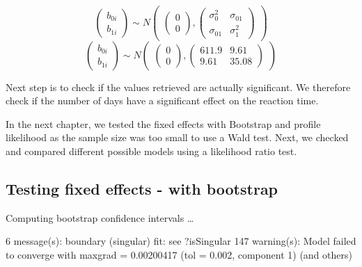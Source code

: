 \documentclass[
]{article}
\begin{document}
\[
\begin{pmatrix} b_{0i} \\ b_{1i} \end{pmatrix}
\sim N
\begin{pmatrix}
\begin{pmatrix} 0 \\ 0 \end{pmatrix},
\begin{pmatrix}
\sigma_{0}^2 & \sigma_{01} \\
\sigma_{01} & \sigma_{1}^2 
\end{pmatrix}
\end{pmatrix}
\] \[
\begin{pmatrix} b_{0i} \\ b_{1i} \end{pmatrix}
\sim N
\begin{pmatrix}
\begin{pmatrix} 0 \\ 0 \end{pmatrix},
\begin{pmatrix}
611.9 & 9.61 \\
9.61 & 35.08 
\end{pmatrix}
\end{pmatrix}
\]

Next step is to check if the values retrieved are actually significant.
We therefore check if the number of days have a significant effect on
the reaction time.

In the next chapter, we tested the fixed effects with Bootstrap and
profile likelihood as the sample size was too small to use a Wald test.
Next, we checked and compared different possible models using a
likelihood ratio test.

\hypertarget{testing-fixed-effects---with-bootstrap}{%
\subsection{Testing fixed effects - with
bootstrap}\label{testing-fixed-effects---with-bootstrap}}

Computing bootstrap confidence intervals \ldots{}

6 message(s): boundary (singular) fit: see ?isSingular 147 warning(s):
Model failed to converge with max\textbar grad\textbar{} = 0.00200417
(tol = 0.002, component 1) (and others)
\end{document}
